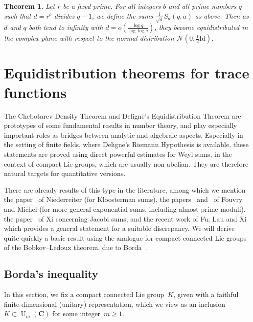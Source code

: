 \documentclass[12pt]{amsart}
\renewcommand{\mathcal}{\mathscr}
\renewcommand{\geq}{\geqslant}
\newcommand{\Cc}{\mathbf{C}}
\DeclareMathOperator{\Un}{U}
\theoremstyle{plain}
\newtheorem{theorem}{Theorem}[section]
\theoremstyle{remark}
\theoremstyle{definition}
\newcommand{\mcN}{\mathcal{N}}
\renewcommand{\geq}{\geqslant}
\begin{document}
\begin{theorem}
  Let $r$ be a fixed prime. For all integers $b$ and all prime numbers
  $q$ such that $d = r^b$ divides $q-1$, we define the sums
  $\frac{1}{\sqrt{d}} S_d(q,a)$ as above. Then as $d$ and $q$ both
  tend to infinity with
  $d = o\left( \frac{\log q}{\log \log q}\right)$, they become
  equidistributed in the complex plane with respect to the normal
  distribution $\mcN(0, \frac{1}{2}\mathrm{Id})$.
\end{theorem}

\section{Equidistribution theorems for trace
  functions}\label{sec-deligne}

The Chebotarev Density Theorem and Deligne's Equidistribution Theorem
are prototypes of some fundamental results in number theory, and play
especially important roles as bridges between analytic and algebraic
aspects. Especially in the setting of finite fields, where Deligne's
Riemann Hypothesis is available, these statements are proved using
direct powerful estimates for Weyl sums, in the context of compact Lie
groups, which are usually non-abelian. They are therefore natural
targets for quantitative versions.

There are already results of this type in the literature, among which
we mention the paper~\cite{niederreiter} of Niederreiter (for
Kloosterman sums), the papers~\cite{fouvry-michel1}
and~\cite{fouvry-michel2} of Fouvry and Michel (for more general
exponential sums, including almost prime moduli), the paper~\cite{xi}
of Xi concerning Jacobi sums, and the recent work of Fu, Lau and
Xi~\cite{fulauxi} which provides a general statement for a suitable
discrepancy.  We will derive quite quickly a basic result using the
analogue for compact connected Lie groups of the Bobkov--Ledoux
theorem, due to Borda~\cite[Th.\,1]{borda_berry_esseen}.

\subsection{Borda's inequality}

In this section, we fix a compact connected Lie group~$K$, given with a
faithful finite-dimensional (unitary) representation, which we view as
an inclusion $K\subset \Un_m(\Cc)$ for some integer~$m\geq 1$.
\end{document}
